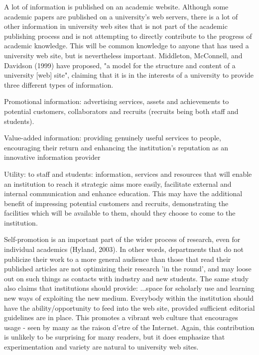 \noindent
A lot of information is published on an academic website. Although some academic papers are published on a university's web servers, there is a lot of other information in university web sites that is not part of the academic publishing process and is not attempting to directly contribute to the progress of academic knowledge. This will be common knowledge to anyone that has used a university web site, but is nevertheless important. Middleton, McConnell, and Davidson (1999) have proposed, "a model for the structure and content of a university [web] site", claiming that it is in the interests of a university to provide three different types of information.
\begin{list}{}{}
\item Promotional information: advertising services, assets and achievements to potential customers, collaborators and recruits (recruits being both staff and students).
\item Value-added information: providing genuinely useful services to people, encouraging their return and enhancing the institution's reputation as an innovative information provider
\item Utility: to staff and students: information, services and resources that will enable an institution to reach it strategic aims more easily, facilitate external and internal communication and enhance education. This may have the additional benefit of impressing potential customers and recruits, demonstrating the facilities which will be available to them, should they choose to come to the institution.
\end{list}

\noindent
Self-promotion is an important part of the wider process of research, even for individual academics (Hyland, 2003). In other words, departments that do not publicize their work to a more general audience than those that read their published articles are not optimizing their research 'in the round', and may loose out on such things as contacts with industry and new students. The same study also claims that institutions should provide:
...space for scholarly use and learning new ways of exploiting the new medium. Everybody within the institution should have the ability/opportunity to feed into the web site, provided sufficient editorial guidelines are in place.
This promotes a vibrant web culture that encourages usage - seen by many as the raison d'etre of the Internet.
Again, this contribution is unlikely to be surprising for many readers, but it does emphasize that experimentation and variety are natural to university web sites.

